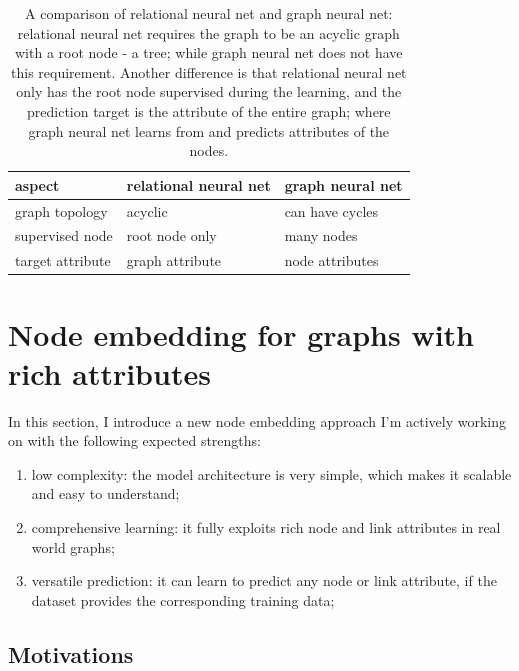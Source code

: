 \documentclass{article}
\begin{document}
\begin{table}[h]
	\centering
	\begin{tabularx}{\textwidth}{ |X|X|X| } \hline
		aspect  & relational neural net & graph neural net \\ \hline
		graph topology & acyclic & can have cycles \\ \hline
		supervised node & root node only & many nodes \\ \hline
		target attribute & graph attribute & node attributes \\ \hline
	\end{tabularx}
	\caption{A comparison of relational neural net and graph neural net: relational neural net requires the graph to be an acyclic graph with a root node - a tree; while graph neural net does not have this requirement. Another difference is that relational neural net only has the root node supervised during the learning, and the prediction target is the attribute of the entire graph; where graph neural net learns from and predicts attributes of the nodes.}
	\label{tab:graphVSrelational}
\end{table}

\section{Node embedding for graphs with rich attributes}

In this section, I introduce a new node embedding approach I'm actively working on with the following expected strengths:
\begin{enumerate}
	\item low complexity: the model architecture is very simple, which makes it scalable and easy to understand;
	\item comprehensive learning: it fully exploits rich node and link attributes in real world graphs;
	\item versatile prediction: it can learn to predict any node or link attribute, if the dataset provides the corresponding training data;
\end{enumerate}

\subsection{Motivations}
\end{document}

